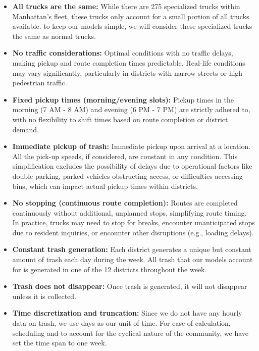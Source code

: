 \documentclass{article}
\begin{document}
\begin{itemize}
    \item \textbf{All trucks are the same:} While there are 275 specialized trucks within Manhattan’s fleet, these trucks only account for a small portion of all trucks available. to keep our models simple, we will consider these specialized trucks the same as normal trucks.

    \item \textbf{No traffic considerations:} Optimal conditions with no traffic delays, making pickup and route completion times predictable. Real-life conditions may vary significantly, particularly in districts with narrow streets or high pedestrian traffic.
    
    \item \textbf{Fixed pickup times (morning/evening slots):} Pickup times in the morning (7 AM - 8 AM) and evening (6 PM - 7 PM) are strictly adhered to, with no flexibility to shift times based on route completion or district demand.
    
    \item \textbf{Immediate pickup of trash:} Immediate pickup upon arrival at a location. All the pick-up speeds, if considered, are constant in any condition. This simplification excludes the possibility of delays due to operational factors like double-parking, parked vehicles obstructing access, or difficulties accessing bins, which can impact actual pickup times within districts. 
    
    \item \textbf{No stopping (continuous route completion):} Routes are completed continuously without additional, unplanned stops, simplifying route timing. In practice, trucks may need to stop for breaks, encounter unanticipated stops due to resident inquiries, or encounter other disruptions (e.g., loading delays).
        
    \item \textbf{Constant trash generation:} Each district generates a unique but constant amount of trash each day during the week. All trash that our models account for is generated in one of the 12 districts throughout the week.


    \item \textbf{Trash does not disappear:} Once trash is generated, it will not disappear unless it is collected.

    \item \textbf{Time discretization and truncation:} Since we do not have any hourly data on trash, we use days as our unit of time. For ease of calculation, scheduling and to account for the cyclical nature of the community, we have set the time span to one week.
\end{itemize}
\end{document}
